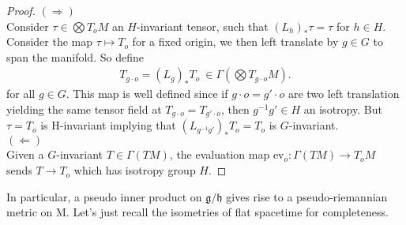 % 
\begin{proof}
    $(\Rightarrow)$\\
    Consider $\tau \in \bigotimes T_oM$ an $H$-invariant tensor, such that $(L_h)_* \tau = \tau$ for $h \in H$.
    Consider the map $\tau \mapsto T_o$ for a fixed origin, we then left translate by $g \in G$ to span the manifold. 
    So define 
    \begin{align*}
        T_{g \cdot o} = (L_g)_* T_o \:\in \Gamma( \bigotimes T_{g \cdot o}M).
    \end{align*}
    for all $g \in G$.
    This map is well defined since if $g \cdot o = g' \cdot o$ are two left translation yielding the same tensor field at $T_{g \cdot o} = T_{g' \cdot o}$, then $g^{-1}g' \in H$ an isotropy.
    But $\tau = T_o$ is H-invariant implying that $(L_{g^{-1}g'})_* T_o = T_o$ is $G$-invariant.
    \\
    $(\Leftarrow)$\\
    Given a $G$-invariant $T \in \Gamma(TM)$, the evaluation map $\mathrm{ev}_o : \Gamma(TM) \rightarrow T_oM$ sends $T \rightarrow T_o$ which has isotropy group $H$.
\end{proof}
% 
In particular, a pseudo inner product on $\mathfrak{g/h}$ gives rise to a pseudo-riemannian metric on M.
% 
% 
Let's just recall the isometries of flat spacetime for completeness.
\label{def:Poincaré group}
